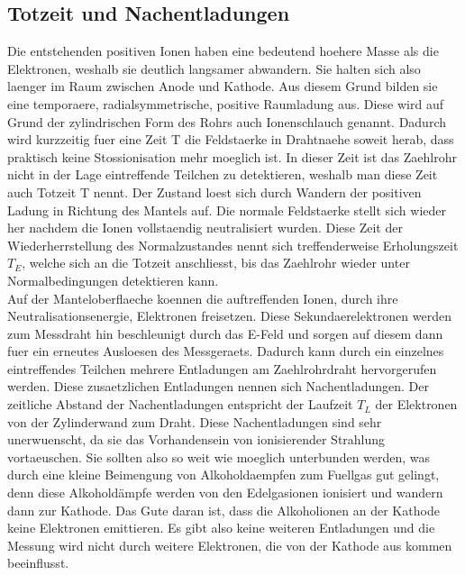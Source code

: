 \documentclass[titlepage=firstcover, captions=tableheading]{scrartcl}
\begin{document}
\subsection{Totzeit und Nachentladungen}
Die entstehenden positiven Ionen haben eine bedeutend hoehere Masse als die Elektronen, weshalb sie deutlich langsamer abwandern. Sie halten sich also laenger im Raum zwischen Anode und Kathode. Aus diesem Grund bilden sie eine temporaere, radialsymmetrische, positive Raumladung aus. Diese wird auf Grund der zylindrischen Form des Rohrs auch Ionenschlauch genannt. Dadurch wird kurzzeitig fuer eine Zeit T die Feldstaerke in Drahtnaehe soweit herab, dass praktisch keine Stossionisation mehr moeglich ist. In dieser Zeit ist das Zaehlrohr nicht in der Lage eintreffende Teilchen zu detektieren, weshalb man diese Zeit auch Totzeit T nennt. Der Zustand loest sich durch Wandern der positiven Ladung in Richtung des Mantels auf. Die normale Feldstaerke stellt sich wieder her nachdem die Ionen vollstaendig neutralisiert wurden. Diese Zeit der Wiederherrstellung des Normalzustandes nennt sich treffenderweise Erholungszeit $T_E$, welche sich an die Totzeit anschliesst, bis das Zaehlrohr wieder unter Normalbedingungen detektieren kann.\\
Auf der Manteloberflaeche koennen die auftreffenden Ionen, durch ihre Neutralisationsenergie, Elektronen freisetzen. Diese Sekundaerelektronen werden zum Messdraht hin beschleunigt durch das E-Feld und sorgen auf diesem dann fuer ein erneutes Ausloesen des Messgeraets. Dadurch kann durch ein einzelnes eintreffendes Teilchen mehrere Entladungen am  Zaehlrohrdraht hervorgerufen werden. Diese zusaetzlichen Entladungen nennen sich Nachentladungen. Der zeitliche Abstand der Nachentladungen entspricht der Laufzeit $T_L$ der Elektronen von der Zylinderwand zum Draht. Diese Nachentladungen sind sehr unerwuenscht, da sie das Vorhandensein von ionisierender Strahlung vortaeuschen. Sie sollten also so weit wie moeglich unterbunden werden, was durch eine kleine Beimengung von Alkoholdaempfen zum Fuellgas gut gelingt, denn diese Alkoholdämpfe werden von den Edelgasionen ionisiert und wandern dann zur Kathode. Das Gute daran ist, dass die Alkoholionen an der Kathode keine Elektronen emittieren. Es gibt also keine weiteren Entladungen und die Messung wird nicht durch weitere Elektronen, die von der Kathode aus kommen beeinflusst.
\end{document}
